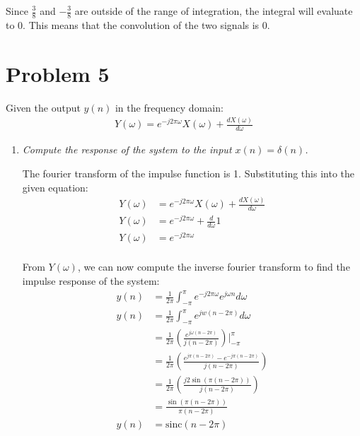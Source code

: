 \documentclass{article}
\begin{document}
Since $\frac{3}{8}$ and $-\frac{3}{8}$ are outside of the range of integration, the integral will evaluate to 0. This means that the convolution of the two signals is 0.

\section{Problem 5}

Given the output $y(n)$ in the frequency domain:
\begin{align*}
    Y(\omega) = e^{-j2\pi \omega}X(\omega) + \frac{dX(\omega)}{d\omega}
\end{align*}

\begin{enumerate}[label=(\alph*)]
    \item \textit{Compute the response of the system to the input $x(n) = \delta(n)$.}

    The fourier transform of the impulse function is 1. Substituting this into the given equation:
    \begin{align*}
        Y(\omega) &= e^{-j2\pi \omega}X(\omega) + \frac{dX(\omega)}{d\omega} \\
        Y(\omega) &= e^{-j2\pi \omega} + \frac{d}{d\omega}1 \\
        Y(\omega) &= e^{-j2\pi \omega} \\
    \end{align*}
    
    From $Y(\omega)$, we can now compute the inverse fourier transform to find the impulse response of the system:
    \begin{align*}
        y(n) &= \frac{1}{2\pi} \int_{-\pi}^{\pi} e^{-j2\pi \omega} e^{j\omega n} d\omega \\
        y(n) &= \frac{1}{2\pi} \int_{-\pi}^{\pi} e^{jw(n-2\pi)} d\omega \\
        &= \frac{1}{2\pi} \left(
            \frac{e^{j\omega(n-2\pi)}}{j(n-2\pi)}
        \right) \Bigg|_{-\pi}^{\pi} \\
        &= \frac{1}{2\pi} \left(
            \frac{e^{j\pi(n-2\pi)} - e^{-j\pi(n-2\pi)}}{j(n-2\pi)}
        \right) \\
        &= \frac{1}{2\pi} \left(
            \frac{j2\sin(\pi(n-2\pi))}{j(n-2\pi)}
        \right) \\
        &= \frac{\sin(\pi(n-2\pi))}{\pi(n-2\pi)} \\
        y(n) &= \text{sinc}(n-2\pi) \\
    \end{align*}



\end{enumerate}
\end{document}
